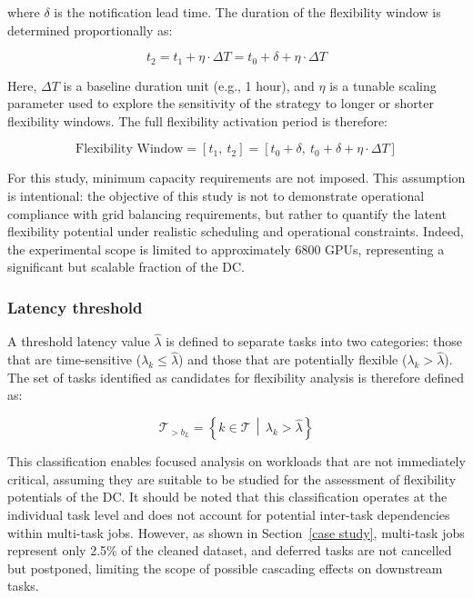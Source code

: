 \documentclass[preprint,12pt]{elsarticle}
\begin{document}
where \( \delta \) is the notification lead time. The duration of the flexibility window is determined proportionally as:

\begin{equation}
    t_2 = t_1 + \eta \cdot \Delta T = t_0 + \delta + \eta \cdot \Delta T
\end{equation}

Here, \( \Delta T \) is a baseline duration unit (e.g., 1 hour), and \( \eta \) is a tunable scaling parameter used to explore the sensitivity of the strategy to longer or shorter flexibility windows. The full flexibility activation period is therefore:

\begin{equation}
    \text{Flexibility Window} = [t_1,\ t_2] = [t_0 + \delta,\ t_0 + \delta + \eta \cdot \Delta T]
\end{equation}

For this study, minimum capacity requirements are not imposed. This assumption is intentional: the objective of this study is not to demonstrate operational compliance with grid balancing requirements, but rather to quantify the latent flexibility potential under realistic scheduling and operational constraints. Indeed, the experimental scope is limited to approximately 6800 GPUs, representing a significant but scalable fraction of the DC. 

\subsubsection{Latency threshold}

A threshold latency value $\hat{\lambda}$ is defined to separate tasks into two categories: those that are time-sensitive ($\lambda_k \leq \hat{\lambda}$) and those that are potentially flexible ($\lambda_k > \hat{\lambda}$). The set of tasks identified as candidates for flexibility analysis is therefore defined as:

\begin{equation}
\mathcal{T}_{>b_L} = \left\{ k \in \mathcal{T} \,\middle|\, \lambda_k > \hat{\lambda} \right\}
\end{equation}

This classification enables focused analysis on workloads that are not immediately critical, assuming they are suitable to be studied for the assessment of flexibility potentials of the DC. It should be noted that this classification operates at the individual task level and does not account for potential inter-task dependencies within multi-task jobs. However, as shown in Section~\ref{case study}, multi-task jobs represent only 2.5\% of the cleaned dataset, and deferred tasks are not cancelled but postponed, limiting the scope of possible cascading effects on downstream tasks.
\end{document}
